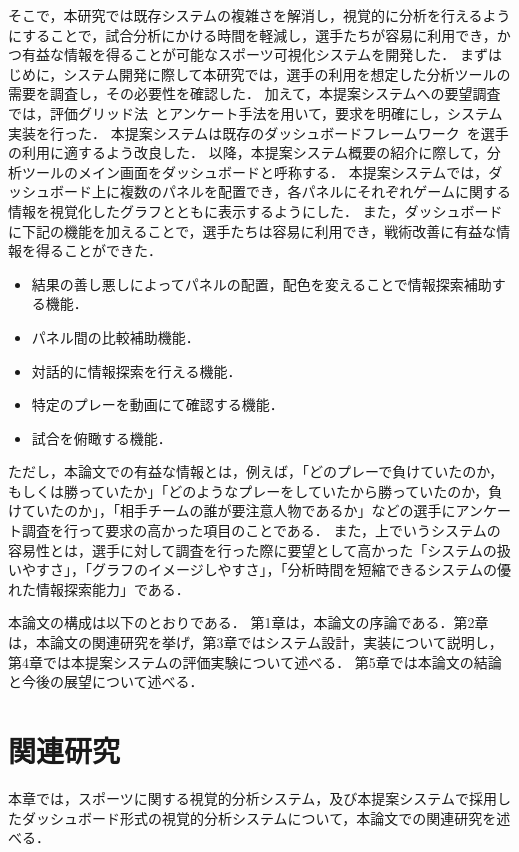 \documentclass[sotsuron]{kuee}
\begin{document}
	そこで，本研究では既存システムの複雑さを解消し，視覚的に分析を行えるようにすることで，試合分析にかける時間を軽減し，選手たちが容易に利用でき，かつ有益な情報を得ることが可能なスポーツ可視化システムを開発した．
	まずはじめに，システム開発に際して本研究では，選手の利用を想定した分析ツールの需要を調査し，その必要性を確認した．
	加えて，本提案システムへの要望調査では，評価グリッド法~\cite{EGM}とアンケート手法を用いて，要求を明確にし，システム実装を行った．
	本提案システムは既存のダッシュボードフレームワーク~\cite{dashboard}を選手の利用に適するよう改良した．
	以降，本提案システム概要の紹介に際して，分析ツールのメイン画面をダッシュボードと呼称する．
	本提案システムでは，ダッシュボード上に複数のパネルを配置でき，各パネルにそれぞれゲームに関する情報を視覚化したグラフとともに表示するようにした．
	また，ダッシュボードに下記の機能を加えることで，選手たちは容易に利用でき，戦術改善に有益な情報を得ることができた．
		\begin{itemize}
			\item 結果の善し悪しによってパネルの配置，配色を変えることで情報探索補助する機能．
			\item パネル間の比較補助機能．
			\item 対話的に情報探索を行える機能．
			\item 特定のプレーを動画にて確認する機能．
			\item 試合を俯瞰する機能．
		\end{itemize}
	ただし，本論文での有益な情報とは，例えば，「どのプレーで負けていたのか，もしくは勝っていたか」「どのようなプレーをしていたから勝っていたのか，負けていたのか」，「相手チームの誰が要注意人物であるか」などの選手にアンケート調査を行って要求の高かった項目のことである．
	また，上でいうシステムの容易性とは，選手に対して調査を行った際に要望として高かった「システムの扱いやすさ」，「グラフのイメージしやすさ」，「分析時間を短縮できるシステムの優れた情報探索能力」である．
	
	本論文の構成は以下のとおりである．
	第1章は，本論文の序論である．第2章は，本論文の関連研究を挙げ，第3章ではシステム設計，実装について説明し，第4章では本提案システムの評価実験について述べる．
	第5章では本論文の結論と今後の展望について述べる．

\chapter{関連研究}
	本章では，スポーツに関する視覚的分析システム，及び本提案システムで採用したダッシュボード形式の視覚的分析システムについて，本論文での関連研究を述べる．
	
\end{document}
